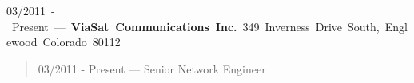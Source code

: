 \mbox{03/2011 - Present --- {\bf ViaSat Communications Inc.} 349 Inverness Drive South, Englewood Colorado 80112}
\begin{quote}
03/2011 - Present --- Senior Network Engineer\\

\end{quote}
